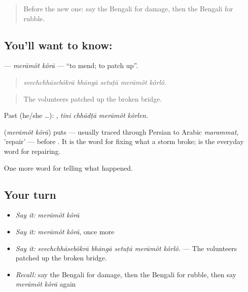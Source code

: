 \begin{quote}
Before the new one: say the Bengali for damage, then the Bengali for rubble.
\end{quote}

\subsection*{You'll want to know:  }
\textbf{ } — \emph{merāmôt kôrā} — \textquotedblleft{}to mend; to patch up\textquotedblright{}.

\begin{quote}
    
\end{quote}

\begin{quote}
\emph{svechchhāsebôkrā bhāngā setuṭā merāmôt kôrlô.}
\end{quote}

\begin{quote}
The volunteers patched up the broken bridge.
\end{quote}

Past (he/she …):    , \emph{tini chhādṭā merāmôt kôrlen}.

\begin{cousinweb}
\textbf{ } (\emph{merāmôt kôrā}) puts  — usually traced through Persian to Arabic \emph{marammat}, 'repair' — before . It is the word for fixing what a storm broke; \textbf{} is the everyday word for repairing.
\end{cousinweb}

\begin{grammarlens}[title={What you've built}]
One more word for telling what happened.
\end{grammarlens}

\subsection*{Your turn}
\begin{itemize}
\raggedright
  \item \emph{Say it:} \emph{merāmôt kôrā}
  \item \emph{Say it:} \emph{merāmôt kôrā}, once more
  \item \emph{Say it:} \emph{svechchhāsebôkrā bhāngā setuṭā merāmôt kôrlô.} — The volunteers patched up the broken bridge.
  \item \emph{Recall:} say the Bengali for damage, then the Bengali for rubble, then say \emph{merāmôt kôrā} again
\end{itemize}

